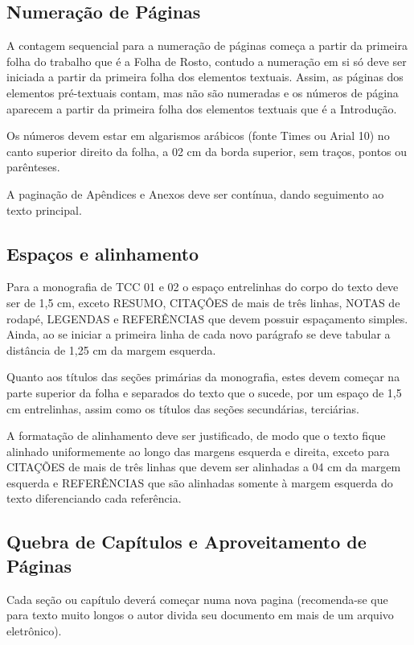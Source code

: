 \subsection{Numeração de Páginas}

A contagem sequencial para a numeração de páginas começa a partir da 
primeira folha do trabalho que é a Folha de Rosto, contudo a numeração em 
si só deve ser iniciada a partir da primeira folha dos elementos textuais. 
Assim, as páginas dos elementos pré-textuais contam, mas não são numeradas 
e os números de página aparecem a partir da primeira folha dos elementos 
textuais que é a Introdução. 

Os números devem estar em algarismos arábicos (fonte Times ou Arial 10) no 
canto superior direito da folha, a 02 cm da borda superior, sem traços, 
pontos ou parênteses. 

A paginação de Apêndices e Anexos deve ser contínua, dando seguimento ao 
texto principal.

\subsection{Espaços e alinhamento}

Para a monografia de TCC 01 e 02 o espaço entrelinhas do corpo do texto 
deve ser de 1,5 cm, exceto RESUMO, CITAÇÔES de mais de três linhas, NOTAS 
de rodapé, LEGENDAS e REFERÊNCIAS que devem possuir espaçamento simples. 
Ainda, ao se iniciar a primeira linha de cada novo parágrafo se deve 
tabular a distância de 1,25 cm da margem esquerda.

Quanto aos títulos das seções primárias da monografia, estes devem começar 
na parte superior da folha e separados do texto que o sucede, por um espaço 
de 1,5 cm entrelinhas, assim como os títulos das seções secundárias, 
terciárias. 

A formatação de alinhamento deve ser justificado, de modo que o texto fique 
alinhado uniformemente ao longo das margens esquerda e direita, exceto para 
CITAÇÕES de mais de três linhas que devem ser alinhadas a 04 cm da margem 
esquerda e REFERÊNCIAS que são alinhadas somente à margem esquerda do texto 
diferenciando cada referência.

\subsection{Quebra de Capítulos e Aproveitamento de Páginas}

Cada seção ou capítulo deverá começar numa nova pagina (recomenda-se que 
para texto muito longos o autor divida seu documento em mais de um arquivo 
eletrônico). 

